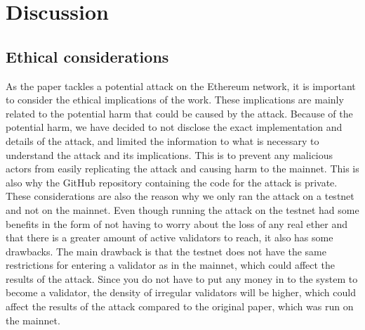 

\section{Discussion}\label{sec:discussion}

\subsection{Ethical considerations}\label{subsec:ethical-considerations}
As the paper tackles a potential attack on the Ethereum network, it is important to consider the ethical implications of the work.
These implications are mainly related to the potential harm that could be caused by the attack.
Because of the potential harm, we have decided to not disclose the exact implementation and details of the attack, and limited the information to what is necessary to understand the attack and its implications.
This is to prevent any malicious actors from easily replicating the attack and causing harm to the mainnet.
This is also why the GitHub repository containing the code for the attack is private.
These considerations are also the reason why we only ran the attack on a testnet and not on the mainnet.
Even though running the attack on the testnet had some benefits in the form of not having to worry about the loss of any real ether and that there is a greater amount of active validators to reach, it also has some drawbacks.
The main drawback is that the testnet does not have the same restrictions for entering a validator as in the mainnet, which could affect the results of the attack.
Since you do not have to put any money in to the system to become a validator, the density of irregular validators will be higher, which could affect the results of the attack compared to the original paper, which was run on the mainnet.


